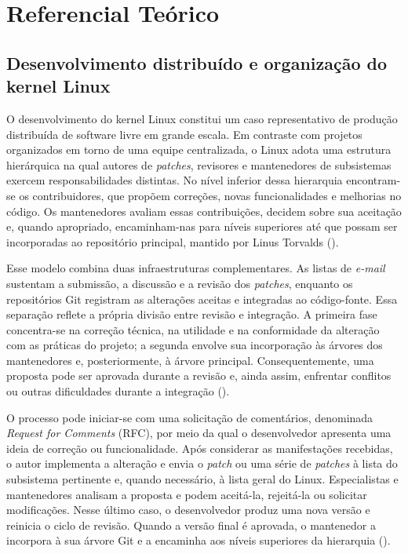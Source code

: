 
\chapter{Referencial Teórico}

\section{Desenvolvimento distribuído e organização do kernel Linux}

O desenvolvimento do kernel Linux constitui um caso representativo de produção distribuída de software livre em grande escala. Em contraste com projetos organizados em torno de uma equipe centralizada, o Linux adota uma estrutura hierárquica na qual autores de \textit{patches}, revisores e mantenedores de subsistemas exercem responsabilidades distintas. No nível inferior dessa hierarquia encontram-se os contribuidores, que propõem correções, novas funcionalidades e melhorias no código. Os mantenedores avaliam essas contribuições, decidem sobre sua aceitação e, quando apropriado, encaminham-nas para níveis superiores até que possam ser incorporadas ao repositório principal, mantido por Linus Torvalds (\cite{ferreira2019maintainers, hoang2021patchnet}).

Esse modelo combina duas infraestruturas complementares. As listas de \textit{e-mail} sustentam a submissão, a discussão e a revisão dos \textit{patches}, enquanto os repositórios Git registram as alterações aceitas e integradas ao código-fonte. Essa separação reflete a própria divisão entre revisão e integração. A primeira fase concentra-se na correção técnica, na utilidade e na conformidade da alteração com as práticas do projeto; a segunda envolve sua incorporação às árvores dos mantenedores e, posteriormente, à árvore principal. Consequentemente, uma proposta pode ser aprovada durante a revisão e, ainda assim, enfrentar conflitos ou outras dificuldades durante a integração (\cite{jiang2013patch}).

O processo pode iniciar-se com uma solicitação de comentários, denominada \textit{Request for Comments} (RFC), por meio da qual o desenvolvedor apresenta uma ideia de correção ou funcionalidade. Após considerar as manifestações recebidas, o autor implementa a alteração e envia o \textit{patch} ou uma série de \textit{patches} à lista do subsistema pertinente e, quando necessário, à lista geral do Linux. Especialistas e mantenedores analisam a proposta e podem aceitá-la, rejeitá-la ou solicitar modificações. Nesse último caso, o desenvolvedor produz uma nova versão e reinicia o ciclo de revisão. Quando a versão final é aprovada, o mantenedor a incorpora à sua árvore Git e a encaminha aos níveis superiores da hierarquia (\cite{ferreira2019maintainers, jiang2013patch}).

